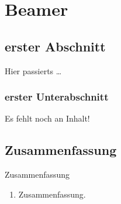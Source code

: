 \chapter{Beamer}


\website

\section{erster Abschnitt}

\begin{Frame}{Hier passierts}
  \ldots
\end{Frame}

\subsection{erster Unterabschnitt}

\begin{Frame}
  Es fehlt noch an Inhalt!
\end{Frame}

\section*{Zusammenfassung}

\begin{frame}{Zusammenfassung}
  \begin{enumerate}
    \item Zusammenfassung.
  \end{enumerate}
\end{frame}